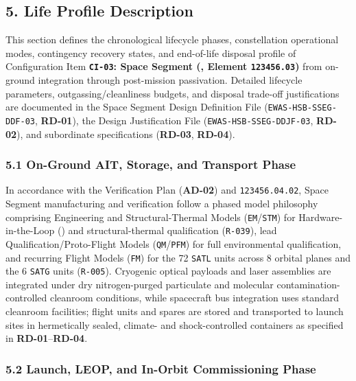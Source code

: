 \subsection{5. Life Profile Description}

This section defines the chronological lifecycle phases, constellation operational modes, contingency recovery states, and end-of-life disposal profile of Configuration Item \textbf{\texttt{CI-03}: Space Segment (,  Element \texttt{123456.03})} from on-ground integration through post-mission passivation. Detailed lifecycle parameters, outgassing/cleanliness budgets, and disposal trade-off justifications are documented in the Space Segment Design Definition File (\texttt{EWAS-HSB-SSEG-DDF-03}, \textbf{RD-01}), the Design Justification File (\texttt{EWAS-HSB-SSEG-DDJF-03}, \textbf{RD-02}), and subordinate specifications (\textbf{RD-03}, \textbf{RD-04}).

\subsubsection{5.1 On-Ground AIT, Storage, and Transport Phase}

In accordance with the Verification Plan (\textbf{AD-02}) and  \texttt{123456.04.02}, Space Segment manufacturing and verification follow a phased model philosophy comprising Engineering and Structural-Thermal Models (\texttt{EM}/\texttt{STM}) for Hardware-in-the-Loop () and structural-thermal qualification (\texttt{R-039}), lead Qualification/Proto-Flight Models (\texttt{QM}/\texttt{PFM}) for full environmental qualification, and recurring Flight Models (\texttt{FM}) for the 72 \texttt{SATL} units across 8 orbital planes and the 6 \texttt{SATG} units (\texttt{R-005}). Cryogenic optical payloads and laser  assemblies are integrated under dry nitrogen-purged particulate and molecular contamination-controlled cleanroom conditions, while spacecraft bus integration uses standard cleanroom facilities; flight units and spares are stored and transported to launch sites in hermetically sealed, climate- and shock-controlled containers as specified in \textbf{RD-01}--\textbf{RD-04}.

\subsubsection{5.2 Launch, LEOP, and In-Orbit Commissioning Phase}

